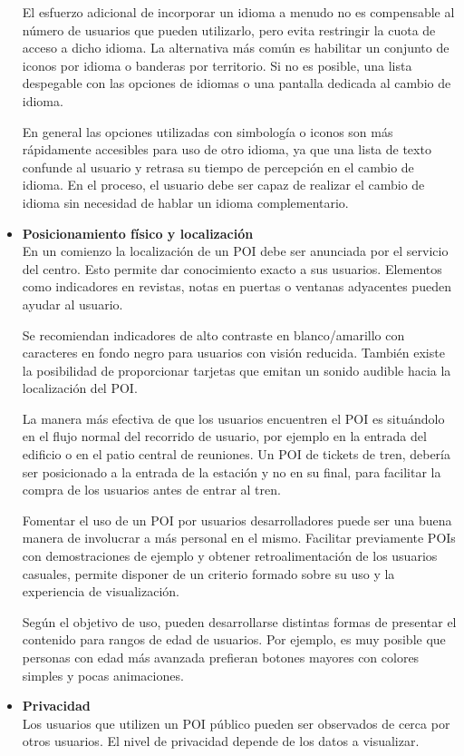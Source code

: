 \begin{itemize}
{El esfuerzo adicional de incorporar un idioma a menudo no es compensable al
número de usuarios que pueden utilizarlo, pero evita restringir la cuota de
acceso a dicho idioma. La alternativa más común es habilitar un conjunto de
iconos por idioma o banderas por territorio\cite{Mag07}. Si no es posible, 
una lista despegable con las opciones de idiomas o una pantalla dedicada al
cambio de idioma.

En general las opciones utilizadas con simbología o iconos son más rápidamente
accesibles para uso de otro idioma, ya que una lista de texto confunde al
usuario y retrasa su tiempo de percepción en el cambio de idioma. En el proceso,
el usuario debe ser capaz de realizar el cambio de idioma sin necesidad de 
hablar un idioma complementario.
  }
  \item{\textbf{Posicionamiento físico y localización}\\
En un comienzo la localización de un POI debe ser anunciada por
el servicio del centro. Esto permite dar conocimiento exacto a sus usuarios.
Elementos como indicadores en revistas, notas en puertas o ventanas adyacentes
pueden ayudar al usuario.

Se recomiendan indicadores de alto contraste en blanco/amarillo con caracteres
en fondo negro\cite{Mag07} para usuarios con visión reducida. También existe la 
posibilidad de proporcionar tarjetas que emitan un sonido audible hacia la 
localización del POI.

La manera más efectiva de que los usuarios encuentren el POI es situándolo en el
flujo normal del recorrido de usuario, por ejemplo en la entrada del edificio o
en el patio central de reuniones. Un POI de tickets de tren,
debería ser posicionado a la entrada de la estación y no en su final, para
facilitar la compra de los usuarios antes de entrar al tren.

Fomentar el uso de un POI por usuarios desarrolladores puede ser una buena
manera de involucrar a más personal en el mismo. Facilitar previamente POIs con
demostraciones de ejemplo y obtener retroalimentación de los usuarios 
casuales, permite disponer de un
criterio formado sobre su uso y la experiencia de visualización.

Según el objetivo de uso, pueden desarrollarse distintas formas de presentar el
contenido para rangos de edad de usuarios. Por ejemplo, es muy posible que
personas con edad más avanzada prefieran botones mayores con colores simples y
pocas animaciones.
  }
  \item{\textbf{Privacidad}\\
Los usuarios que utilizen un POI público pueden ser observados de cerca por
otros usuarios. El nivel de privacidad depende de los datos a visualizar.

}
\end{itemize}
